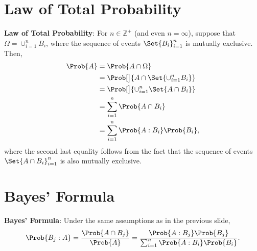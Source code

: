 \section*{Law of Total Probability}
\begin{Regular}
    \textbf{Law of Total Probability}: For $ n\in\mathbb{Z}^+ $ (and even $ n=\infty $), suppose that $ \Omega=\cup_{i=1}^n B_i $,
    where the sequence of events $ \Set{B_i}_{i=1}^n $ is mutually exclusive. Then,
    \begin{align*}
        \Prob{A}
         & =\Prob{A\cap \Omega}                          \\
         & =\Prob[\big]{A\cap\Set{\cup_{i=1}^n B_i}}     \\
         & =\Prob[\big]{\cup_{i=1}^n\Set{A\cap B_i}}     \\
         & =\sum_{i=1}^{n} \Prob{A\cap B_i}              \\
         & =\sum_{i=1}^{n} \Prob{A\given B_i}\Prob{B_i},
    \end{align*}
    where the second last equality follows from the fact that the sequence of events $ \Set{A\cap B_i}_{i=1}^n $ is also
    mutually exclusive.
\end{Regular}
\section*{Bayes' Formula}
\begin{Regular}
    \textbf{Bayes' Formula}: Under the same assumptions as in the previous slide,
    \[ \Prob{B_j\given A}=\frac{\Prob{A\cap B_j}}{\Prob{A}}=\frac{\Prob{A\given B_j}\Prob{B_j}}{\sum_{i=1}^{n} \Prob{A\given B_i}\Prob{B_i}}.  \]
\end{Regular}
